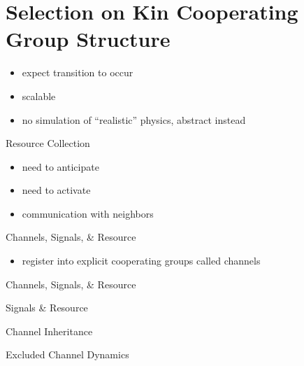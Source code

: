\section{Selection on Kin Cooperating Group Structure}

\begin{frame}
\begin{itemize}
\item expect transition to occur
\item scalable
\item no simulation of ``realistic'' physics, abstract instead
\end{itemize}
\end{frame}

\begin{frame}{Resource Collection}
\begin{itemize}
\item need to anticipate
\item need to activate
\item communication with neighbors
\end{itemize}
\end{frame}

\begin{frame}{Channels, Signals, \& Resource}
\begin{itemize}
\item register into explicit cooperating groups called channels
\end{itemize}
\end{frame}

\begin{frame}{Channels, Signals, \& Resource}
\end{frame}

\begin{frame}{Signals \& Resource}
  \vspace{4ex}
  
\end{frame}

\begin{frame}{Channel Inheritance}
  \vspace{8ex}
  
\end{frame}

\begin{frame}{Excluded Channel Dynamics}
  \vspace{6.6ex}
  
\end{frame}
